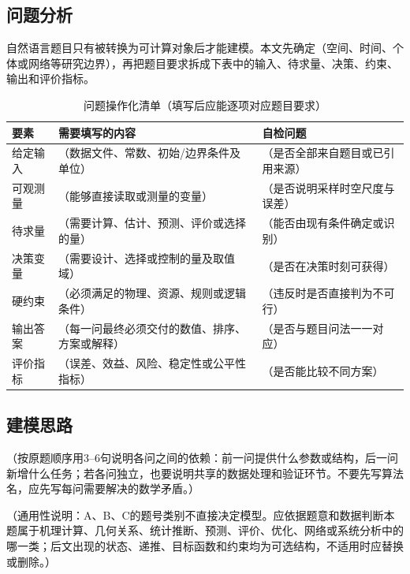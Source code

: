 \documentclass[UTF8,zihao=-4]{ctexart}
\newcommand{\fillin}[1]{（#1）}
\begin{document}
\subsection{问题分析}

自然语言题目只有被转换为可计算对象后才能建模。本文先确定\fillin{空间、时间、个体或网络等研究边界}，再把题目要求拆成下表中的输入、待求量、决策、约束、输出和评价指标。

\begin{table}[htbp]
  \centering
  \caption{问题操作化清单（填写后应能逐项对应题目要求）}
  \small
  \begin{tabularx}{0.96\textwidth}{C{2.0cm}LL}
    \toprule
    要素 & 需要填写的内容 & 自检问题 \\
    \midrule
    给定输入 & \fillin{数据文件、常数、初始/边界条件及单位} & \fillin{是否全部来自题目或已引用来源} \\
    可观测量 & \fillin{能够直接读取或测量的变量} & \fillin{是否说明采样时空尺度与误差} \\
    待求量 & \fillin{需要计算、估计、预测、评价或选择的量} & \fillin{能否由现有条件确定或识别} \\
    决策变量 & \fillin{需要设计、选择或控制的量及取值域} & \fillin{是否在决策时刻可获得} \\
    硬约束 & \fillin{必须满足的物理、资源、规则或逻辑条件} & \fillin{违反时是否直接判为不可行} \\
    输出答案 & \fillin{每一问最终必须交付的数值、排序、方案或解释} & \fillin{是否与题目问法一一对应} \\
    评价指标 & \fillin{误差、效益、风险、稳定性或公平性指标} & \fillin{是否能比较不同方案} \\
    \bottomrule
  \end{tabularx}
\end{table}

\subsection{建模思路}

\fillin{按原题顺序用3--6句说明各问之间的依赖：前一问提供什么参数或结构，后一问新增什么任务；若各问独立，也要说明共享的数据处理和验证环节。不要先写算法名，应先写每问需要解决的数学矛盾。}

\fillin{通用性说明：A、B、C的题号类别不直接决定模型。应依据题意和数据判断本题属于机理计算、几何关系、统计推断、预测、评价、优化、网络或系统分析中的哪一类；后文出现的状态、递推、目标函数和约束均为可选结构，不适用时应替换或删除。}
\end{document}
